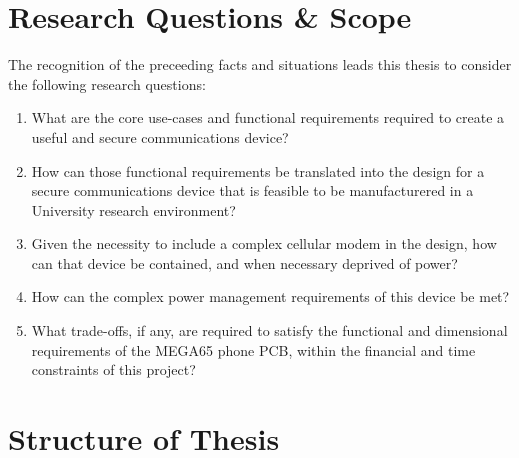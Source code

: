 
\section{Research Questions \& Scope}
The recognition of the preceeding facts and situations leads this thesis to consider the following research questions:
\begin{enumerate}
\item What are the core use-cases and functional requirements required to create a useful and secure communications device?
  \item How can those functional requirements be translated into the design for a secure communications device that is feasible to be manufacturered in a University research environment?
  \item Given the necessity to include a complex cellular modem in the design, how can that device be contained, and when necessary deprived of power?
    \item How can the complex power management requirements of this device be met?
  \item What trade-offs, if any, are required to satisfy the functional and dimensional requirements of the MEGA65 phone PCB, within the financial and time constraints of this project?
\end{enumerate}

\section{Structure of Thesis}

